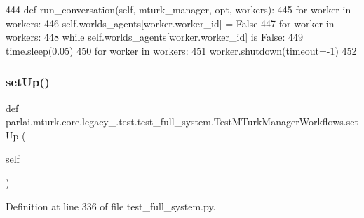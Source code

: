 \begin{DoxyCode}
444     \textcolor{keyword}{def }run\_conversation(self, mturk\_manager, opt, workers):
445         \textcolor{keywordflow}{for} worker \textcolor{keywordflow}{in} workers:
446             self.worlds\_agents[worker.worker\_id] = \textcolor{keyword}{False}
447         \textcolor{keywordflow}{for} worker \textcolor{keywordflow}{in} workers:
448             \textcolor{keywordflow}{while} self.worlds\_agents[worker.worker\_id] \textcolor{keywordflow}{is} \textcolor{keyword}{False}:
449                 time.sleep(0.05)
450         \textcolor{keywordflow}{for} worker \textcolor{keywordflow}{in} workers:
451             worker.shutdown(timeout=-1)
452 
\end{DoxyCode}
\mbox{\label{classparlai_1_1mturk_1_1core_1_1legacy__2018_1_1test_1_1test__full__system_1_1TestMTurkManagerWorkflows_ab361c63be767de8fd43419409a0b5b6e}} 
\subsubsection{\texorpdfstring{set\+Up()}{setUp()}}
{\footnotesize\ttfamily def parlai.\+mturk.\+core.\+legacy\+\_.\+test.\+test\+\_\+full\+\_\+system.\+Test\+M\+Turk\+Manager\+Workflows.\+set\+Up (\begin{DoxyParamCaption}\item[{}]{self }\end{DoxyParamCaption})}



Definition at line 336 of file test\+\_\+full\+\_\+system.\+py.


